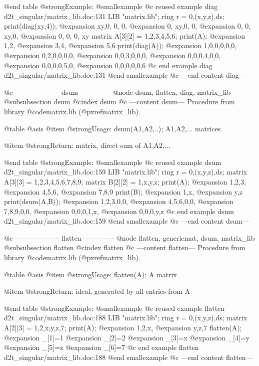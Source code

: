 @end table
@strong{Example:}
@smallexample
@c reused example diag d2t_singular/matrix_lib.doc:131 
LIB "matrix.lib";
ring r = 0,(x,y,z),ds;
print(diag(xy,4));
@expansion{} xy,0, 0, 0,
@expansion{} 0, xy,0, 0,
@expansion{} 0, 0, xy,0,
@expansion{} 0, 0, 0, xy
matrix A[3][2] = 1,2,3,4,5,6;
print(A);
@expansion{} 1,2,
@expansion{} 3,4,
@expansion{} 5,6 
print(diag(A));
@expansion{} 1,0,0,0,0,0,
@expansion{} 0,2,0,0,0,0,
@expansion{} 0,0,3,0,0,0,
@expansion{} 0,0,0,4,0,0,
@expansion{} 0,0,0,0,5,0,
@expansion{} 0,0,0,0,0,6 
@c end example diag d2t_singular/matrix_lib.doc:131
@end smallexample
@c ---end content diag---

@c ------------------- dsum -------------
@node dsum, flatten, diag, matrix_lib
@subsubsection dsum
@cindex dsum
@c ---content dsum---
Procedure from library @code{matrix.lib} (@pxref{matrix_lib}).

@table @asis
@item @strong{Usage:}
dsum(A1,A2,..); A1,A2,... matrices

@item @strong{Return:}
matrix, direct sum of A1,A2,...

@end table
@strong{Example:}
@smallexample
@c reused example dsum d2t_singular/matrix_lib.doc:159 
LIB "matrix.lib";
ring r = 0,(x,y,z),ds;
matrix A[3][3] = 1,2,3,4,5,6,7,8,9;
matrix B[2][2] = 1,x,y,z;
print(A);
@expansion{} 1,2,3,
@expansion{} 4,5,6,
@expansion{} 7,8,9 
print(B);
@expansion{} 1,x,
@expansion{} y,z 
print(dsum(A,B));
@expansion{} 1,2,3,0,0,
@expansion{} 4,5,6,0,0,
@expansion{} 7,8,9,0,0,
@expansion{} 0,0,0,1,x,
@expansion{} 0,0,0,y,z 
@c end example dsum d2t_singular/matrix_lib.doc:159
@end smallexample
@c ---end content dsum---

@c ------------------- flatten -------------
@node flatten, genericmat, dsum, matrix_lib
@subsubsection flatten
@cindex flatten
@c ---content flatten---
Procedure from library @code{matrix.lib} (@pxref{matrix_lib}).

@table @asis
@item @strong{Usage:}
flatten(A); A matrix

@item @strong{Return:}
ideal, generated by all entries from A

@end table
@strong{Example:}
@smallexample
@c reused example flatten d2t_singular/matrix_lib.doc:188 
LIB "matrix.lib";
ring r = 0,(x,y,z),ds;
matrix A[2][3] = 1,2,x,y,z,7;
print(A);
@expansion{} 1,2,x,
@expansion{} y,z,7 
flatten(A);
@expansion{} _[1]=1
@expansion{} _[2]=2
@expansion{} _[3]=x
@expansion{} _[4]=y
@expansion{} _[5]=z
@expansion{} _[6]=7
@c end example flatten d2t_singular/matrix_lib.doc:188
@end smallexample
@c ---end content flatten---

